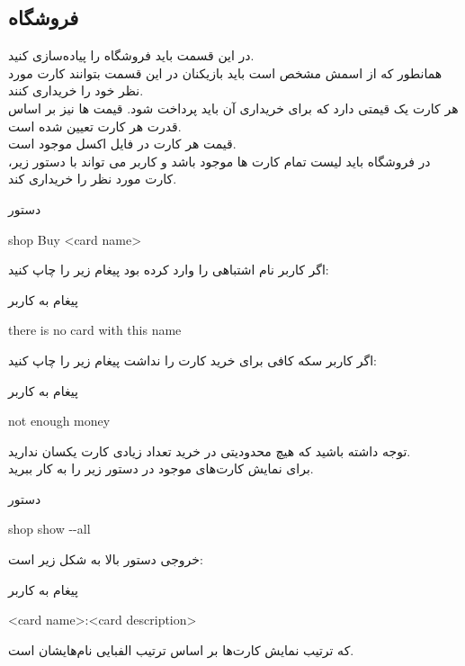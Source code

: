 \documentclass[]{article}
\begin{document}
\subsection*{{\titr فروشگاه}}
در این قسمت باید فروشگاه را پیاده‌سازی کنید.
\\
همانطور که از اسمش مشخص است باید بازیکنان در این قسمت بتوانند کارت مورد نظر 
خود را خریداری کنند.
\\
هر کارت یک قیمتی دارد که برای خریداری آن باید پرداخت شود. قیمت ها نیز بر 
اساس قدرت هر کارت تعیین شده است.
\\
قیمت هر کارت در فایل اکسل موجود است.
\\
در فروشگاه باید لیست تمام کارت ها موجود باشد و کاربر می تواند با دستور زیر، 
کارت مورد نظر را خریداری کند.
\begin{mybox}[colback=yellow]{دستور}
	\begin{latin}	
		shop Buy <card name>
	\end{latin}
\end{mybox}
اگر کاربر  نام اشتباهی را وارد کرده بود پیغام زیر را چاپ کنید:
\begin{mybox}[colback=yellow]{پیغام به کاربر}
	\begin{latin}	
		there is no card with this name
	\end{latin}
\end{mybox}
اگر کاربر سکه کافی برای خرید کارت را نداشت پیغام زیر را چاپ کنید:
\begin{mybox}[colback=yellow]{پیغام به کاربر}
	\begin{latin}	
		not enough money
	\end{latin}
\end{mybox}
توجه داشته باشید که هیچ محدودیتی در خرید تعداد زیادی کارت یکسان ندارید.
\\
برای نمایش کارت‌های موجود در  دستور زیر را به کار ببرید.
\begin{mybox}[colback=yellow]{دستور}
	\begin{latin}	
		shop show -{}-all
	\end{latin}
\end{mybox}
خروجی دستور بالا به شکل زیر است:
\begin{mybox}[colback=yellow]{پیغام به کاربر}
	\begin{latin}	
		<card name>:<card description>
	\end{latin}
\end{mybox}
که ترتیب نمایش کارت‌ها بر اساس ترتیب الفبایی نام‌هایشان است.
\end{document}
